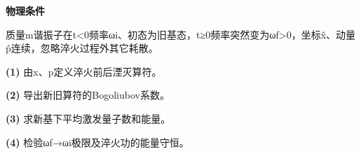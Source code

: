\textbf{物理条件}\par 质量m谐振子在t<0频率ωi、初态为旧基态，t≥0频率突然变为ωf>0，坐标x̂、动量p̂连续，忽略淬火过程外其它耗散。
\par\noindent\textbf{(1)} 由x、p定义淬火前后湮灭算符。
\par\noindent\textbf{(2)} 导出新旧算符的Bogoliubov系数。
\par\noindent\textbf{(3)} 求新基下平均激发量子数和能量。
\par\noindent\textbf{(4)} 检验ωf→ωi极限及淬火功的能量守恒。
